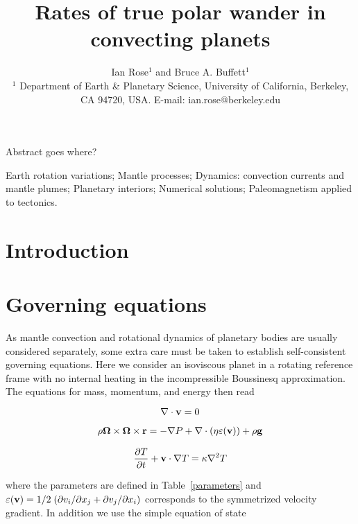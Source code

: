 \documentclass[extra]{gji}
\title[TPW Rates]
  {Rates of true polar wander in convecting planets}
\author[I. Rose and B. Buffett]
  {Ian Rose$^1$ and Bruce A. Buffett$^1$ \\
  $^1$ Department of Earth \& Planetary Science, University of California, Berkeley, CA 94720, USA.  E-mail: ian.rose@berkeley.edu
  }
\date{}
\begin{document}
\label{firstpage}

\maketitle

\begin{summary}
Abstract goes where?
\end{summary}

\begin{keywords}
Earth rotation variations; Mantle processes; Dynamics: convection currents and mantle plumes; Planetary interiors; Numerical solutions; Paleomagnetism applied to tectonics.
\end{keywords}

\section{Introduction}


\section{Governing equations}

As mantle convection and rotational dynamics of planetary bodies are usually considered separately, some extra care must be taken to establish self-consistent governing equations.  
Here we consider an isoviscous planet in a rotating reference frame with no internal heating in the incompressible Boussinesq approximation.  The equations for mass, momentum, and energy then read

\begin{equation}
\nabla \cdot {\bf v} = 0
\label{conserve_mass}
\end{equation}

\begin{equation}
\begin{aligned}
 \rho{\bf \Omega \times \Omega \times r}= - \nabla P + \nabla \cdot \left( \eta \varepsilon ({\bf v}) \right) + \rho {\bf g}
\label{navier_stokes}
\end{aligned}
\end{equation}

\begin{equation}
\frac{\partial T}{\partial t} + {\bf v} \cdot \nabla T = \kappa \nabla^2 T
\label{energy}
\end{equation}

 where the parameters are defined in Table~\ref{parameters} and $\varepsilon({\bf v}) = 1/2 \; ( \partial v_i / \partial x_j + \partial v_j / \partial x_i )$ corresponds to the symmetrized velocity gradient.
 In addition we use the simple equation of state
\end{document}
